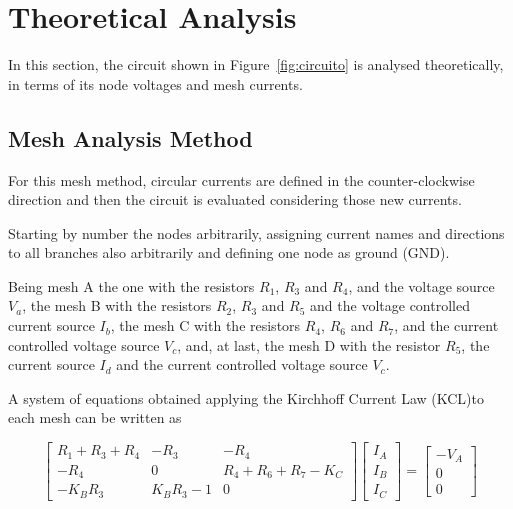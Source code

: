 \section{Theoretical Analysis}
\label{sec:analysis}

\hspace{0,5cm} In this section, the circuit shown in Figure~\ref{fig:circuito} is analysed theoretically, in terms of its node voltages and mesh currents.

\subsection{Mesh Analysis Method}

\hspace{0,5cm} For this mesh method, circular currents are defined in the counter-clockwise direction and then the circuit is evaluated considering those new currents.

Starting by number the nodes arbitrarily, assigning current names and directions to all branches also arbitrarily and defining one node as ground (GND). 

Being mesh A the one with the resistors $R_1$, $R_3$ and $R_4$, and the voltage source $V_a$, the mesh B with the resistors $R_2$, $R_3$ and $R_5$ and the voltage controlled current source $I_b$, the mesh C with the resistors $R_4$, $R_6$ and $R_7$, and the current controlled voltage source $V_c$, and, at last, the mesh D with the resistor $R_5$, the current source $I_d$ and the current controlled voltage source $V_c$. 

A system of equations obtained applying the Kirchhoff Current Law (KCL)to each mesh can be written as 

\begin{equation}
\begin{bmatrix} 
R_1 + R_3 + R_4 & -R_3 & -R_4 \\ 
-R_4 & 0 & R_4 + R_6 + R_7 - K_C\\
-K_B R_3 & K_B R_3 - 1 & 0
\end{bmatrix} 
\begin{bmatrix} 
I_A \\ 
I_B \\ 
I_C
\end{bmatrix} =
\begin{bmatrix} 
-V_A \\ 
0 \\ 
0
\end{bmatrix}
\end{equation}

